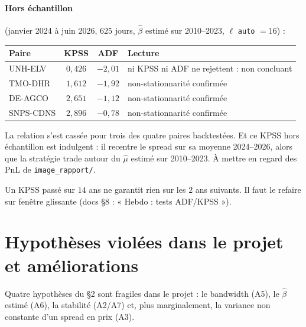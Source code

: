 \documentclass[11pt,a4paper]{article}
\newcommand{\code}[1]{\texttt{#1}}
\theoremstyle{definition}
\begin{document}
\paragraph{Hors échantillon} (janvier 2024 à juin 2026, $625$ jours, $\hat\beta$ estimé sur 2010--2023, $\ell$ \code{auto} $= 16$) :

\begin{center}
\begin{tabular}{@{}lccl@{}}
\toprule
Paire & KPSS & ADF & Lecture \\
\midrule
UNH-ELV & $0{,}426$ & $-2{,}01$ & ni KPSS ni ADF ne rejettent : non concluant \\
TMO-DHR & $1{,}612$ & $-1{,}92$ & non-stationnarité confirmée \\
DE-AGCO & $2{,}651$ & $-1{,}12$ & non-stationnarité confirmée \\
SNPS-CDNS & $2{,}896$ & $-0{,}78$ & non-stationnarité confirmée \\
\bottomrule
\end{tabular}
\end{center}

La relation s'est cassée pour trois des quatre paires backtestées. Et ce KPSS hors échantillon est indulgent : il recentre le spread sur sa moyenne 2024--2026, alors que la stratégie trade autour du $\hat\mu$ estimé sur 2010--2023. À mettre en regard des PnL de \code{image\_rapport/}.

\begin{retenir}
Un KPSS passé sur $14$ ans ne garantit rien sur les $2$ ans suivants. Il faut le refaire sur fenêtre glissante (docs \S8 : « Hebdo : tests ADF/KPSS »).
\end{retenir}

\section{Hypothèses violées dans le projet et améliorations}\label{sec:limites}

Quatre hypothèses du \S2 sont fragiles dans le projet : le bandwidth (A5), le $\hat\beta$ estimé (A6), la stabilité (A2/A7) et, plus marginalement, la variance non constante d'un spread en prix (A3).
\end{document}
